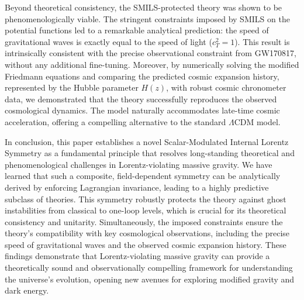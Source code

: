 \documentclass[twocolumn]{aastex631}
\begin{document}
Beyond theoretical consistency, the SMILS-protected theory was shown to be phenomenologically viable. The stringent constraints imposed by SMILS on the potential functions led to a remarkable analytical prediction: the speed of gravitational waves is exactly equal to the speed of light ($c_T^2=1$). This result is intrinsically consistent with the precise observational constraint from GW170817, without any additional fine-tuning. Moreover, by numerically solving the modified Friedmann equations and comparing the predicted cosmic expansion history, represented by the Hubble parameter $H(z)$, with robust cosmic chronometer data, we demonstrated that the theory successfully reproduces the observed cosmological dynamics. The model naturally accommodates late-time cosmic acceleration, offering a compelling alternative to the standard $\Lambda$CDM model.

In conclusion, this paper establishes a novel Scalar-Modulated Internal Lorentz Symmetry as a fundamental principle that resolves long-standing theoretical and phenomenological challenges in Lorentz-violating massive gravity. We have learned that such a composite, field-dependent symmetry can be analytically derived by enforcing Lagrangian invariance, leading to a highly predictive subclass of theories. This symmetry robustly protects the theory against ghost instabilities from classical to one-loop levels, which is crucial for its theoretical consistency and unitarity. Simultaneously, the imposed constraints ensure the theory's compatibility with key cosmological observations, including the precise speed of gravitational waves and the observed cosmic expansion history. These findings demonstrate that Lorentz-violating massive gravity can provide a theoretically sound and observationally compelling framework for understanding the universe's evolution, opening new avenues for exploring modified gravity and dark energy.

{}

\end{document}
